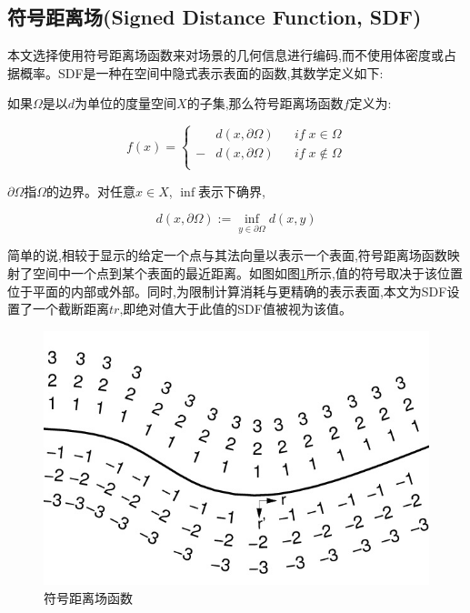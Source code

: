 \subsection{符号距离场(Signed Distance Function, SDF)}
本文选择使用符号距离场函数\cite{sdf}来对场景的几何信息进行编码,而不使用体密度或占据概率。SDF是一种在空间中隐式表示表面的函数,其数学定义如下:

如果$\Omega$是以$d$为单位的度量空间$X$的子集,那么符号距离场函数$f$定义为:

$$f(x) = \left\{
\begin{aligned}
&d(x,\partial\Omega)&&if\; x\in\Omega \\
-&d(x,\partial\Omega)&&if\; x\notin\Omega\\
\end{aligned}
\right.
$$

$\partial\Omega$指$\Omega$的边界。对任意$x\in X$, $\inf$表示下确界,

$$
d(x,\partial\Omega) := \inf_{y\in \partial\Omega}d(x,y)
$$

简单的说,相较于显示的给定一个点与其法向量以表示一个表面,符号距离场函数映射了空间中一个点到某个表面的最近距离。如图如图\ref{sdf_figure}所示,值的符号取决于该位置位于平面的内部或外部。同时,为限制计算消耗与更精确的表示表面,本文为SDF设置了一个截断距离$tr$,即绝对值大于此值的SDF值被视为该值。
\begin{figure}[htbp]
    \centering
    \includegraphics[scale=0.3]{figures/sdf_figure.jpeg}
    \caption{符号距离场函数}\label{sdf_figure}
\end{figure}
